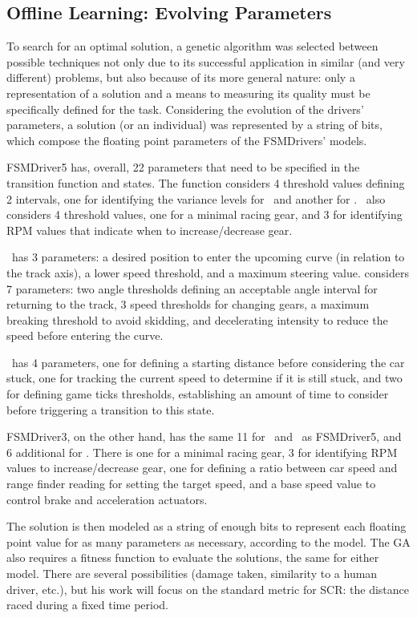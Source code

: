 \subsection{Offline Learning: Evolving Parameters}%
To search for an optimal solution, a genetic algorithm was selected between possible techniques not only due to its successful application in similar (and very different) problems, but also because of its more general nature: only a representation of a solution and a means to measuring its quality must be specifically defined for the task. Considering the evolution of the drivers' parameters, a solution (or an individual) was represented by a string of bits, which compose the floating point parameters of the FSMDrivers' models.

FSMDriver5 has, overall, 22 parameters that need to be specified in the transition function and states. The function considers 4 threshold values defining 2 intervals, one for identifying the variance levels for \SL~and another for \AC. \SL~also considers 4 threshold values, one for a minimal racing gear, and 3 for identifying RPM values that indicate when to increase/decrease gear.

\AC~has 3 parameters: a desired position to enter the upcoming curve (in relation to the track axis), a lower speed threshold, and a maximum steering value. \OT considers 7 parameters: two angle thresholds defining an acceptable angle interval for returning to the track, 3 speed thresholds for changing gears, a maximum breaking threshold to avoid skidding, and decelerating intensity to reduce the speed before entering the curve.

\St~has 4 parameters, one for defining a starting distance before considering the car stuck, one for tracking the current speed to determine if it is still stuck, and two for defining game ticks thresholds, establishing an amount of time to consider before triggering a transition to this state.

FSMDriver3, on the other hand, has the same 11 for \OT~and \St~as FSMDriver5, and 6 additional for \IT. There is one for a minimal racing gear, 3 for identifying RPM values to increase/decrease gear, one for defining a ratio between car speed and range finder reading for setting the target speed, and a base speed value to control brake and acceleration actuators.

The solution is then modeled as a string of enough bits to represent each floating point value for as many parameters as necessary, according to the model. The GA also requires a fitness function to evaluate the solutions, the same for either model. There are several possibilities (damage taken, similarity to a human driver, etc.), but his work will focus on the standard metric for SCR: the distance raced during a fixed time period.



